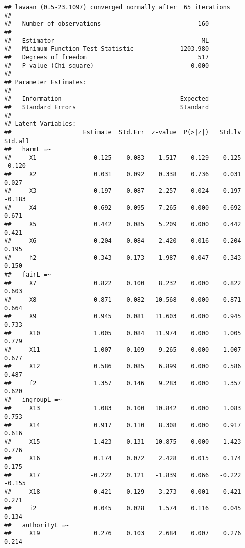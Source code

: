 \documentclass[english,man]{apa6}
\newcounter{author}
\theoremstyle{definition}
\theoremstyle{definition}
\theoremstyle{definition}
\theoremstyle{remark}
\begin{document}
\begin{verbatim}
## lavaan (0.5-23.1097) converged normally after  65 iterations
## 
##   Number of observations                           160
## 
##   Estimator                                         ML
##   Minimum Function Test Statistic             1203.980
##   Degrees of freedom                               517
##   P-value (Chi-square)                           0.000
## 
## Parameter Estimates:
## 
##   Information                                 Expected
##   Standard Errors                             Standard
## 
## Latent Variables:
##                    Estimate  Std.Err  z-value  P(>|z|)   Std.lv  Std.all
##   harmL =~                                                              
##     X1               -0.125    0.083   -1.517    0.129   -0.125   -0.120
##     X2                0.031    0.092    0.338    0.736    0.031    0.027
##     X3               -0.197    0.087   -2.257    0.024   -0.197   -0.183
##     X4                0.692    0.095    7.265    0.000    0.692    0.671
##     X5                0.442    0.085    5.209    0.000    0.442    0.421
##     X6                0.204    0.084    2.420    0.016    0.204    0.195
##     h2                0.343    0.173    1.987    0.047    0.343    0.150
##   fairL =~                                                              
##     X7                0.822    0.100    8.232    0.000    0.822    0.603
##     X8                0.871    0.082   10.568    0.000    0.871    0.664
##     X9                0.945    0.081   11.603    0.000    0.945    0.733
##     X10               1.005    0.084   11.974    0.000    1.005    0.779
##     X11               1.007    0.109    9.265    0.000    1.007    0.677
##     X12               0.586    0.085    6.899    0.000    0.586    0.487
##     f2                1.357    0.146    9.283    0.000    1.357    0.620
##   ingroupL =~                                                           
##     X13               1.083    0.100   10.842    0.000    1.083    0.753
##     X14               0.917    0.110    8.308    0.000    0.917    0.616
##     X15               1.423    0.131   10.875    0.000    1.423    0.776
##     X16               0.174    0.072    2.428    0.015    0.174    0.175
##     X17              -0.222    0.121   -1.839    0.066   -0.222   -0.155
##     X18               0.421    0.129    3.273    0.001    0.421    0.271
##     i2                0.045    0.028    1.574    0.116    0.045    0.134
##   authorityL =~                                                         
##     X19               0.276    0.103    2.684    0.007    0.276    0.214

\end{verbatim}
\end{document}
